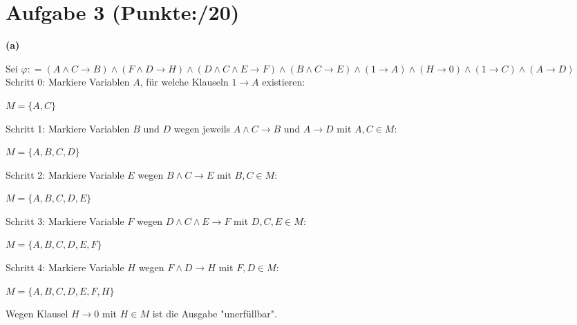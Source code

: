 \documentclass[11pt, a4paper]{article}
\newcommand{\defgr}{\mathrel{\mathop:\!\!=}}
\newcommand{\ppp}{20}
\begin{document}
\section*{Aufgabe 3 (Punkte:\qquad/\ppp)}

\textbf{(a)}
\begin{adjustwidth}{20pt}{20pt}
Sei $\varphi \defgr (A \wedge C \rightarrow B)\wedge(F \wedge D \rightarrow H)\wedge(D \wedge C \wedge E \rightarrow F)\wedge(B \wedge C \rightarrow E)\wedge(1 \rightarrow A)\wedge(H \rightarrow 0)\wedge(1 \rightarrow C)\wedge(A \rightarrow D)$\\

Schritt 0: Markiere Variablen $A$, für welche Klauseln $1 \rightarrow A$ existieren:\\
\begin{center}
	$M = \{A,C\}$\\
\end{center}
\vspace*{15 pt}

Schritt 1: Markiere Variablen $B$ und $D$ wegen jeweils $A \wedge C \rightarrow B$ und  $A \rightarrow D$ mit $A,C \in M$:\\
\begin{center}
	$M = \{A, B, C, D\}$\\
\end{center}
\vspace*{15 pt}

Schritt 2: Markiere Variable $E$ wegen  $B \wedge C \rightarrow E$ mit $B,C \in M$:\\
\begin{center}
	$M = \{A, B, C, D, E\}$\\
\end{center}
\vspace*{15 pt}
Schritt 3: Markiere Variable $F$ wegen  $D \wedge C \wedge E \rightarrow F$ mit $
D,C,E \in M$:\\
\begin{center}
	$M = \{A, B, C, D, E, F\}$\\
\end{center}
\vspace*{15 pt}
Schritt 4: Markiere Variable $H$ wegen  $F \wedge D \rightarrow H$ mit $
F,D \in M$:\\
\begin{center}
	$M = \{A, B, C, D, E, F, H\}$\\
\end{center}
\vspace*{15 pt}

Wegen Klausel $H \rightarrow 0$ mit $H \in M$ ist die Ausgabe "unerfüllbar".
\end{adjustwidth}
\end{document}

